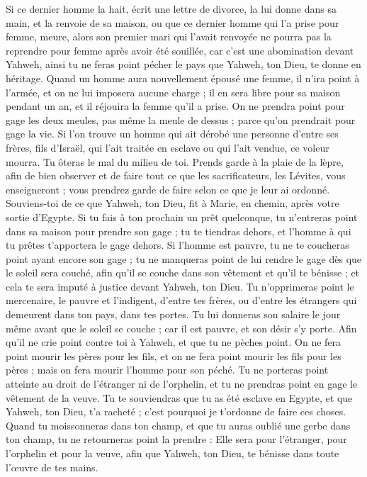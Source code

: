 \begin{multicols}{2}
Si ce dernier homme la hait, écrit une lettre de divorce, la lui donne dans sa main, et la renvoie de sa maison, ou que ce dernier homme qui l'a prise pour femme, meure,
alors son premier mari qui l'avait renvoyée ne pourra pas la reprendre pour femme après avoir été souillée, car c'est une abomination devant Yahweh, ainsi tu ne feras point pécher le pays que Yahweh, ton Dieu, te donne en héritage.
Quand un homme aura nouvellement épousé une femme, il n'ira point à l’armée, et on ne lui imposera aucune charge ; il en sera libre pour sa maison pendant un an, et il réjouira la femme qu'il a prise.
On ne prendra point pour gage les deux meules, pas même la meule de dessus ; parce qu'on prendrait pour gage la vie.
Si l’on trouve un homme qui ait dérobé une personne d’entre ses frères, fils d'Israël, qui l’ait traitée en esclave ou qui l’ait vendue, ce voleur mourra. Tu ôteras le mal du milieu de toi.
Prends garde à la plaie de la lèpre, afin de bien observer et de faire tout ce que les sacrificateurs, les Lévites, vous enseigneront ; vous prendrez garde de faire selon ce que je leur ai ordonné.
Souviens-toi de ce que Yahweh, ton Dieu, fit à Marie, en chemin, après votre sortie d'Egypte.
Si tu fais à ton prochain un prêt quelconque, tu n'entreras point dans sa maison pour prendre son gage ;
tu te tiendras dehors, et l'homme à qui tu prêtes t'apportera le gage dehors.
Si l'homme est pauvre, tu ne te coucheras point ayant encore son gage ;
tu ne manqueras point de lui rendre le gage dès que le soleil sera couché, afin qu'il se couche dans son vêtement et qu'il te bénisse ; et cela te sera imputé à justice devant Yahweh, ton Dieu.
Tu n’opprimeras point le mercenaire, le pauvre et l’indigent, d'entre tes frères, ou d'entre les étrangers qui demeurent dans ton pays, dans tes portes.
Tu lui donneras son salaire le jour même avant que le soleil se couche ; car il est pauvre, et son désir s’y porte. Afin qu'il ne crie point contre toi à Yahweh, et que tu ne pèches point.
On ne fera point mourir les pères pour les fils, et on ne fera point mourir les fils pour les pères ; mais on fera mourir l’homme pour son péché.
Tu ne porteras point atteinte au droit de l'étranger ni de l'orphelin, et tu ne prendras point en gage le vêtement de la veuve.
Tu te souviendras que tu as été esclave en Egypte, et que Yahweh, ton Dieu, t'a racheté ; c'est pourquoi je t’ordonne de faire ces choses.
Quand tu moissonneras dans ton champ, et que tu auras oublié une gerbe dans ton champ, tu ne retourneras point la prendre : Elle sera pour l'étranger, pour l'orphelin et pour la veuve, afin que Yahweh, ton Dieu, te bénisse dans toute l’œuvre de tes mains.

\end{multicols}
